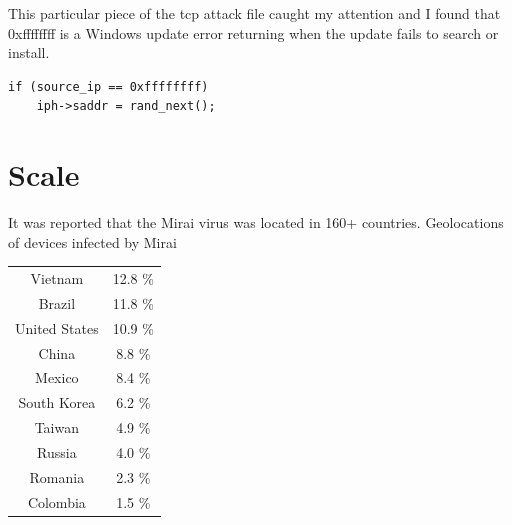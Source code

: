 \documentclass[12pt, letterpaper]{article}
\begin{document}
\begin{sloppypar}
\begin{flushleft}


\begin{verbatim}

\end{verbatim}

This particular piece of the tcp attack file caught my attention and I found
that 0xffffffff is a Windows update error returning when the update fails to search
or install. 

\begin{lstlisting}
if (source_ip == 0xffffffff)
	iph->saddr = rand_next();
\end{lstlisting}

\newpage

\section*{Scale}
It was reported that the Mirai virus was located in 160+ countries.
Geolocations of devices infected by Mirai

\begin{center}
\begin{tabular}{c c}
Vietnam	& 12.8 \%\\
Brazil & 11.8 \%\\
United States & 10.9 \%\\
China & 8.8 \%\\
Mexico & 8.4 \%\\
South Korea	& 6.2 \%\\
Taiwan & 4.9 \%\\
Russia & 4.0 \%\\
Romania	& 2.3 \%\\
Colombia	 & 1.5 \%\\
\end{tabular}
\end{center}




\end{flushleft}
\end{sloppypar}
\end{document}
